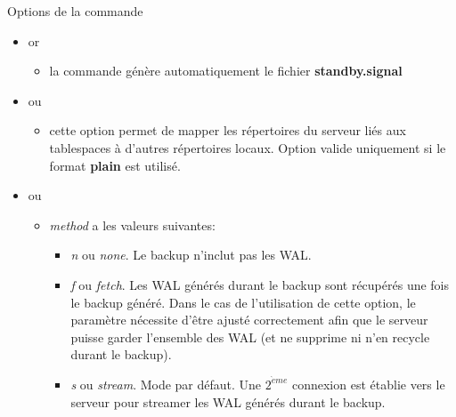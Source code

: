 \begin{frame}{Options de la commande }

\begin{itemize}
   \item {} or 
   \begin{itemize}
      \item la commande génère automatiquement le fichier \textbf{standby.signal}
   \end{itemize}
   \item {} ou 
   \begin{itemize}
      \item cette option permet de mapper les répertoires du serveur liés aux tablespaces à d'autres répertoires locaux. Option valide uniquement si le format \textbf{plain} est utilisé. 
   \end{itemize}
   \item {} ou 
   \begin{itemize}
   \item \textit{method} a les valeurs suivantes:
      \begin{itemize}
         \item  \textit{n} ou \textit{none}. Le backup n'inclut pas les WAL.
         \item  \textit{f} ou \textit{fetch}. Les WAL générés durant le backup sont récupérés une fois le backup généré. Dans le cas de l'utilisation de cette option, le paramètre  nécessite d'être ajusté correctement afin que le serveur puisse garder l'ensemble des WAL (et ne supprime ni n'en recycle durant le backup).
         \item  \textit{s} ou \textit{stream}. Mode par défaut. Une $2^{\grave{e}me}$ connexion est établie vers le serveur pour streamer les WAL générés durant le backup.
      \end{itemize}
   \end{itemize}
\end{itemize}

\end{frame}


